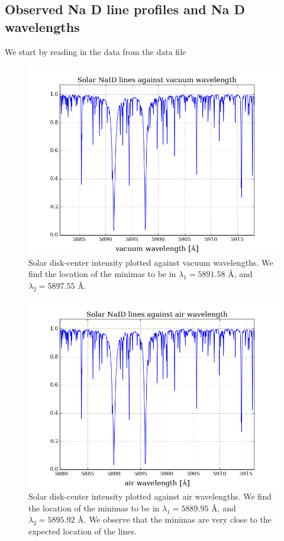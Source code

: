 \documentclass{article}
\begin{document}
\subsection{Observed Na D line profiles and Na D wavelengths}
We start by reading in the data from the data file
\begin{figure}[H]
  \centering
  \includegraphics[scale=0.5]{../figures/task3/NaID_wav_vac_sigma.png}
  \caption{Solar disk-center intensity plotted against vacuum wavelengths. We find the location of the minimas to be in $\lambda_1 = 5891.58$ Å, and $\lambda_2 = 5897.55$ Å.}
\end{figure}
\begin{figure}[H]
  \centering
  \includegraphics[scale=0.5]{../figures/task3/NaID_wav_air_sigma.png}
  \caption{Solar disk-center intensity plotted against air wavelengths. We find the location of the minimas to be in $\lambda_1 = 5889.95$ Å, and $\lambda_2 = 5895.92$ Å. We observe that the minimas are very close to the expected location of the lines.}
\end{figure}
\end{document}
